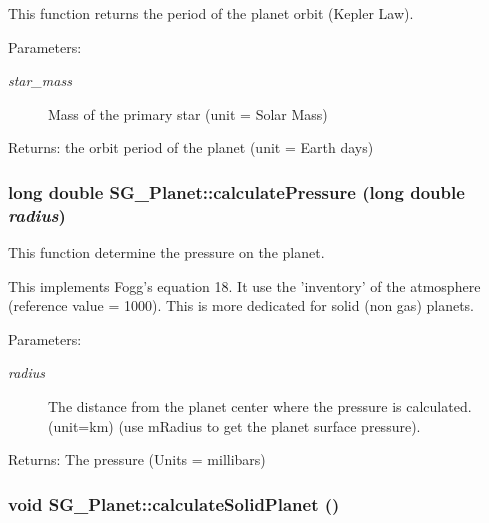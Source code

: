 This function returns the period of the planet orbit (Kepler Law). 

\begin{Desc}
\item[Parameters:]
\begin{description}
\item[{\em star\_\-mass}]Mass of the primary star (unit = Solar Mass) \end{description}
\end{Desc}
\begin{Desc}
\item[Returns:]the orbit period of the planet (unit = Earth days) \end{Desc}
\subsubsection{\setlength{\rightskip}{0pt plus 5cm}long double SG\_\-Planet::calculate\-Pressure (long double {\em radius})\hspace{0.3cm}{\tt  [protected]}}\label{class_s_g___planet_b28}


This function determine the pressure on the planet. 

This implements Fogg's equation 18. It use the 'inventory' of the atmosphere (reference value = 1000). This is more dedicated for solid (non gas) planets. \begin{Desc}
\item[Parameters:]
\begin{description}
\item[{\em radius}]The distance from the planet center where the pressure is calculated. (unit=km) (use m\-Radius to get the planet surface pressure). \end{description}
\end{Desc}
\begin{Desc}
\item[Returns:]The pressure (Units = millibars) \end{Desc}
\subsubsection{\setlength{\rightskip}{0pt plus 5cm}void SG\_\-Planet::calculate\-Solid\-Planet ()\hspace{0.3cm}{\tt  [protected]}}\label{class_s_g___planet_b1}


